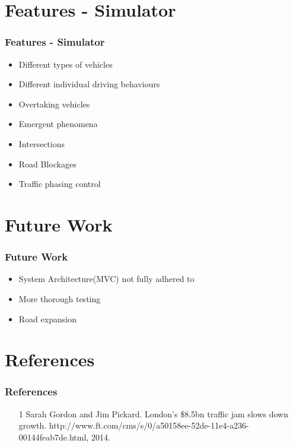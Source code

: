 \documentclass{beamer}
\begin{document}
\section{Features - Simulator}

\begin{frame}
\frametitle{Features - Simulator}
	\begin{itemize}
		\item Different types of vehicles
		\item Different individual driving behaviours 
		\item Overtaking vehicles
		\item Emergent phenomena
		\item Intersections  
		\item Road Blockages
		\item Traffic phasing control
	\end{itemize}

\end{frame}

\section{Future Work}

\begin{frame}
\frametitle{Future Work}
	
\begin{itemize}
	\item System Architecture(MVC) not fully adhered to
	\item More thorough testing 
	\item Road expansion  
\end{itemize}

\end{frame}




\section{References}

\begin{frame}
\frametitle{References}

	\begin{itemize}
		\item [1] Sarah Gordon and Jim Pickard. London's \$8.5bn traffic jam slows down growth. http://www.ft.com/cms/s/0/a50158ee-52de-11e4-a236- 00144feab7de.html, 2014.				
\end{itemize}

\end{frame}
\end{document}
